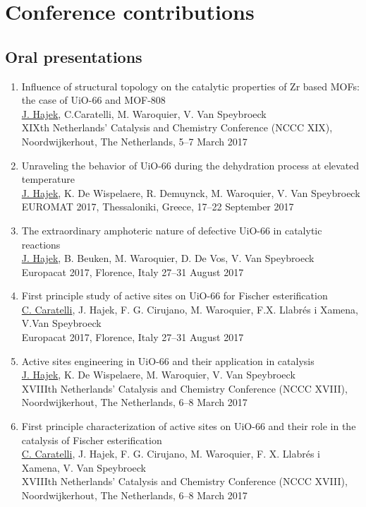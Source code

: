 \section*{Conference contributions}
\subsection*{Oral presentations}

\begin{enumerate}

\item
Influence of structural topology on the catalytic properties of Zr based MOFs: the case of UiO-66 and MOF-808\\
\underline{J. Hajek}, C.Caratelli, M. Waroquier, V. Van Speybroeck\\
XIXth Netherlands' Catalysis and Chemistry Conference (NCCC XIX),
Noordwijkerhout, The Netherlands, 5--7 March 2017
\item
Unraveling the behavior of UiO-66 during the dehydration process at elevated temperature\\
\underline {J. Hajek}, K. De Wispelaere, R. Demuynck, M. Waroquier, V. Van
Speybroeck\\
EUROMAT 2017, Thessaloniki, Greece, 17--22 September 2017

\item
The extraordinary amphoteric nature of defective UiO-66 in catalytic reactions\\
\underline{J. Hajek}, B. Beuken, M. Waroquier, D. De Vos, V. Van Speybroeck  \\
Europacat 2017, Florence, Italy 27--31 August 2017

\item
First principle study of active sites on UiO-66 for Fischer esterification\\
\underline{C. Caratelli}, J. Hajek, F. G. Cirujano, M. Waroquier, F.X. Llabr\'es
i Xamena, V.Van Speybroeck\\
Europacat 2017, Florence, Italy 27--31 August 2017
\item
Active sites engineering in UiO-66 and their application in catalysis\\
\underline{J. Hajek}, K. De Wispelaere, M. Waroquier, V. Van Speybroeck\\
XVIIIth Netherlands' Catalysis and Chemistry Conference (NCCC XVIII),
Noordwijkerhout, The Netherlands, 6--8 March 2017

\item
First principle characterization of active sites on UiO-66 and their role in the
catalysis of Fischer esterification\\
\underline{C. Caratelli}, J. Hajek, F. G.
Cirujano, M. Waroquier, F. X.
Llabr\'es i Xamena, V. Van Speybroeck \\
XVIIIth Netherlands' Catalysis and Chemistry Conference (NCCC XVIII),
Noordwijkerhout, The Netherlands, 6--8 March 2017


\end{enumerate}
